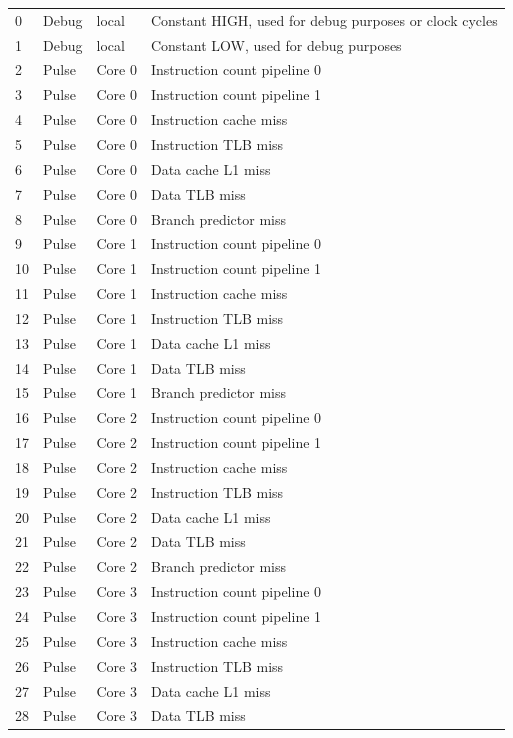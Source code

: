 \begin{center}
\begin{longtable}{|l|l|l|l|}
\hline
0 & Debug & local &  Constant HIGH, used for debug purposes or clock cycles \\
1 & Debug & local &  Constant LOW, used for debug purposes \\
2 & Pulse & Core 0 &  Instruction count pipeline 0 \\
3 & Pulse & Core 0 &  Instruction count pipeline 1 \\
4 & Pulse & Core 0 &  Instruction cache miss \\
5 & Pulse & Core 0 &  Instruction TLB miss \\
6 & Pulse & Core 0 &  Data cache L1 miss \\
7 & Pulse & Core 0 &  Data TLB miss \\
8 & Pulse & Core 0 &  Branch predictor miss \\
9 & Pulse & Core 1 &  Instruction count pipeline 0 \\
10 & Pulse & Core 1 &  Instruction count pipeline 1 \\
11 & Pulse & Core 1 &  Instruction cache miss \\
12 & Pulse & Core 1 &  Instruction TLB miss \\
13 & Pulse & Core 1 &  Data cache L1 miss \\
14 & Pulse & Core 1 &  Data TLB miss \\
15 & Pulse & Core 1 &  Branch predictor miss \\
16 & Pulse & Core 2 &  Instruction count pipeline 0 \\
17 & Pulse & Core 2 &  Instruction count pipeline 1 \\
18 & Pulse & Core 2 &  Instruction cache miss \\
19 & Pulse & Core 2 &  Instruction TLB miss \\
20 & Pulse & Core 2 &  Data cache L1 miss \\
21 & Pulse & Core 2 &  Data TLB miss \\
22 & Pulse & Core 2 &  Branch predictor miss \\
23 & Pulse & Core 3 &  Instruction count pipeline 0 \\
24 & Pulse & Core 3 &  Instruction count pipeline 1 \\
25 & Pulse & Core 3 &  Instruction cache miss \\
26 & Pulse & Core 3 &  Instruction TLB miss \\
27 & Pulse & Core 3 &  Data cache L1 miss \\
28 & Pulse & Core 3 &  Data TLB miss \\

\end{longtable}
\end{center}
